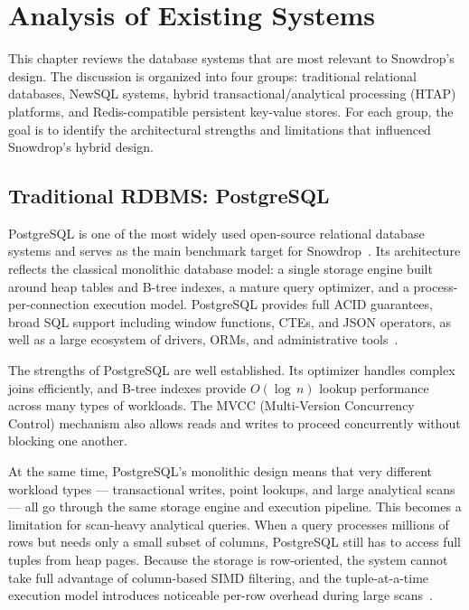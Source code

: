 %
%
\chapter{Analysis of Existing Systems}
\label{chap:existing-systems}
\setlength{\parskip}{1em}

This chapter reviews the database systems that are most relevant to Snowdrop’s design. The discussion is organized into four groups: traditional relational databases, NewSQL systems, hybrid transactional/analytical processing (HTAP) platforms, and Redis-compatible persistent key-value stores. For each group, the goal is to identify the architectural strengths and limitations that influenced Snowdrop’s hybrid design.

\section{Traditional RDBMS: PostgreSQL}

PostgreSQL is one of the most widely used open-source relational database systems and serves as the main benchmark target for Snowdrop~\cite{postgresql2026}. Its architecture reflects the classical monolithic database model: a single storage engine built around heap tables and B-tree indexes, a mature query optimizer, and a process-per-connection execution model. PostgreSQL provides full ACID guarantees, broad SQL support including window functions, CTEs, and JSON operators, as well as a large ecosystem of drivers, ORMs, and administrative tools~\cite{codd1970}.

The strengths of PostgreSQL are well established. Its optimizer handles complex joins efficiently, and B-tree indexes provide \(O(\log\,n)\) lookup performance across many types of workloads. The MVCC (Multi-Version Concurrency Control) mechanism also allows reads and writes to proceed concurrently without blocking one another.

At the same time, PostgreSQL’s monolithic design means that very different workload types --- transactional writes, point lookups, and large analytical scans --- all go through the same storage engine and execution pipeline. This becomes a limitation for scan-heavy analytical queries. When a query processes millions of rows but needs only a small subset of columns, PostgreSQL still has to access full tuples from heap pages. Because the storage is row-oriented, the system cannot take full advantage of column-based SIMD filtering, and the tuple-at-a-time execution model introduces noticeable per-row overhead during large scans~\cite{abadi2013}.

